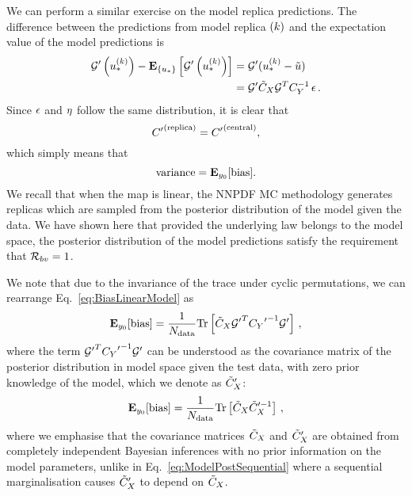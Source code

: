 We can perform a similar exercise on the model replica predictions. The
difference between the predictions from model replica $(k)$ and the
expectation value of the model predictions is
\begin{equation}
    \begin{split}
        {{\mathcal{G}}^{\prime}}\left(u_*^{(k)}\right) -
        \mathbf{E}_{\{ u_* \}} \left[ {{\mathcal{G}}^{\prime}}\left(u_*^{(k)}\right) \right] &=
        {{\mathcal{G}}^{\prime}} (u_*^{(k)} - \tilde{u}) \\
        &= {{\mathcal{G}}^{\prime}} \tilde{C}_X \mathcal{G}^T C_{Y}^{-1} \, \epsilon \, .
    \end{split}
\end{equation}
Since $\epsilon$ and $\eta$ follow the same distribution, it is clear that
\begin{equation}
    {{C}^{\prime}}^{(\rm replica)} = {{C}^{\prime}}^{(\rm central)},
\end{equation}
which simply means that
\begin{equation}
    {\rm variance} = \mathbf{E}_{y_0}[{\rm bias}].
\end{equation}
We recall that when the map is linear, the NNPDF MC methodology generates
replicas which are sampled from the posterior distribution of the model given
the data. We have shown here that provided the underlying law belongs to the
model space, the posterior distribution of the model predictions satisfy the
requirement that $\mathcal{R}_{bv} = 1$.

We note that due to the invariance of the trace under cyclic permutations, we
can rearrange Eq.~\ref{eq:BiasLinearModel} as
\begin{equation}
    \mathbf{E}_{y_0}[{\rm bias}] = \frac{1}{N_{\rm data}}
    {\rm Tr} \left[
        \tilde{C}_X
        {{\mathcal{G}}^{\prime}}^T {{C_{Y}}^{\prime}}^{-1} {{\mathcal{G}}^{\prime}}
    \right] \, ,
\end{equation}
where the term ${{\mathcal{G}}^{\prime}}^T {{C_{Y}}^{\prime}}^{-1}
{{\mathcal{G}}^{\prime}}$ can be understood as the covariance matrix of the posterior
distribution in model space given the test data, with zero prior knowledge of
the model, which we denote as $\tilde{C}_X'$:
\begin{equation}\label{eq:BiasTraceModelPost}
    \mathbf{E}_{y_0}[{\rm bias}] = \frac{1}{N_{\rm data}}
    {\rm Tr} \left[ \tilde{C}_X {\tilde{C}_X}^{ \prime -1} \right] \, ,
\end{equation}
where we emphasise that the covariance matrices $\tilde{C}_X$ and
${{\tilde{C}_X}^{\prime}}$ are obtained from completely independent Bayesian
inferences with no prior information on the model parameters, unlike in
Eq.~\ref{eq:ModelPostSequential} where a sequential marginalisation causes
${{\tilde{C}_X}^{\prime}}$ to depend on $\tilde{C}_X$.

